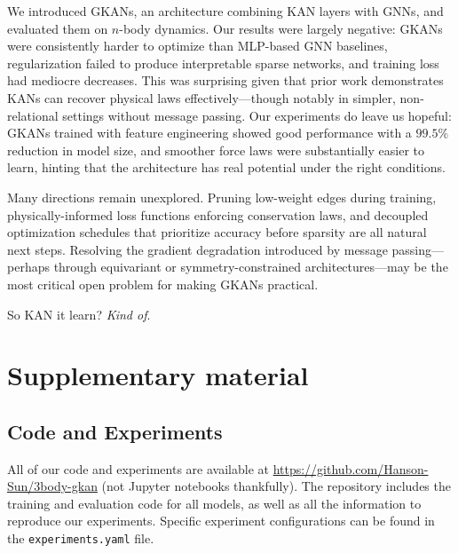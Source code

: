 \documentclass{article}
\begin{document}
We introduced GKANs, an architecture combining KAN layers with GNNs, and evaluated them on $n$-body dynamics. Our results were largely negative: GKANs were consistently harder to optimize than MLP-based GNN baselines, regularization failed to produce interpretable sparse networks, and training loss had mediocre decreases. This was surprising given that prior work demonstrates KANs can recover physical laws effectively---though notably in simpler, non-relational settings without message passing. Our experiments do leave us hopeful: GKANs trained with feature engineering showed good performance with a $99.5\%$ reduction in model size, and smoother force laws were substantially easier to learn, hinting that the architecture has real potential under the right conditions.

Many directions remain unexplored. Pruning low-weight edges during training, physically-informed loss functions enforcing conservation laws, and decoupled optimization schedules that prioritize accuracy before sparsity are all natural next steps. Resolving the gradient degradation introduced by message passing---perhaps through equivariant or symmetry-constrained architectures---may be the most critical open problem for making GKANs practical.

So KAN it learn? \textit{Kind of}.

\newpage

\printbibliography[title={References}]

\appendix


\section{Supplementary material} \label{app:info}

\subsection{Code and Experiments}

All of our code and experiments are available at \url{https://github.com/Hanson-Sun/3body-gkan} (not Jupyter notebooks thankfully). The repository includes the training and evaluation code for all models, as well as all the information to reproduce our experiments. Specific experiment configurations can be found in the \texttt{experiments.yaml} file.
\end{document}
